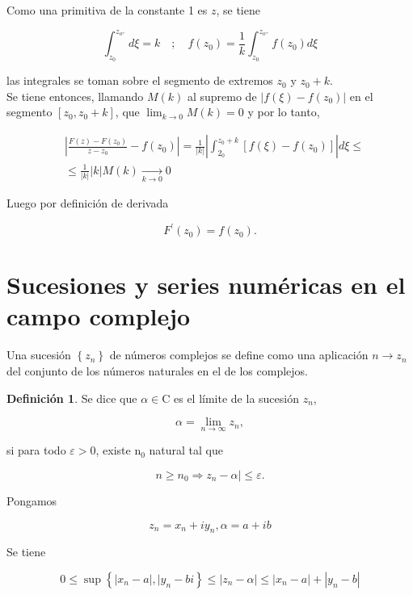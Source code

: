 \documentclass[10pt]{article}
\theoremstyle{plain}
\theoremstyle{definition}
\newtheorem{definition}[theorem]{Definición}
\theoremstyle{remark}
\begin{document}
Como una primitiva de la constante 1 es $z$, se tiene

$$
\int_{z_{0}}^{z_{o^{+}}} d \xi=k \quad ; \quad f\left(z_{0}\right)=\frac{1}{k} \int_{z_{0}}^{z_{o^{+}}} f\left(z_{0}\right) d \xi
$$

las integrales se toman sobre el segmento de extremos $z_{0}$ y $z_{0}+k$.\\
Se tiene entonces, llamando $M(k)$ al supremo de $\left|f(\xi)-f\left(z_{0}\right)\right|$ en el segmento $\left[z_{0}, z_{0}+k\right]$, que $\lim _{k \rightarrow 0} M(k)=0$ y por lo tanto,

$$
\begin{aligned}
& \left|\frac{F(z)-F\left(z_{0}\right)}{z-z_{0}}-f\left(z_{0}\right)\right|=\frac{1}{|k|}\left|\int_{2_{0}}^{z_{0}+k}\left[f(\xi)-f\left(z_{0}\right)\right]\right| d \xi \leqslant \\
& \leqslant \frac{1}{|k|}|k| M(k) \xrightarrow[k \rightarrow 0]{ } 0
\end{aligned}
$$


Luego por definición de derivada

$$
F^{\prime}\left(z_{0}\right)=f\left(z_{0}\right) .
$$

\section{Sucesiones y series numéricas en el campo complejo}
Una sucesión $\left\{z_{n}\right\}$ de números complejos se define como una aplicación $n \rightarrow z_{n}$ del conjunto de los números naturales en el de los complejos.

\begin{definition}
  Se dice que $\alpha \in \mathrm{C}$ es el límite de la sucesión $z_{n}$,

$$
\alpha=\lim _{n \rightarrow \infty} z_{n},
$$

si para todo $\varepsilon>0$, existe $\mathrm{n}_{0}$ natural tal que

\begin{equation*}
  n \geqslant n_{0} \Rightarrow z_{n}-\alpha \mid \leqslant \varepsilon .  \tag{7-1}
\end{equation*}
\end{definition}

Pongamos 

$$ z_{n}=x_{n}+i y_{n}, \alpha=a+i b $$

Se tiene

$$ 0 \leqslant \sup \left\{\left|x_{n}-a\right|, \mid y_{n}-b i\right\} \leqslant\left|z_{n}-\alpha\right| \leqslant\left|x_{n}-a\right|+\left|y_{n}-b\right| $$
\end{document}
